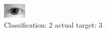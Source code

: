 \begin{figure}[h!]
\begin{center}
\includegraphics[width=0.60\columnwidth]{figures/ID1148_class_2_target_3.png}
\end{center}
\caption{ Classification: 2 actual target: 3}
\label{fig:ID1148_class_2_target_3}
\end{figure}
